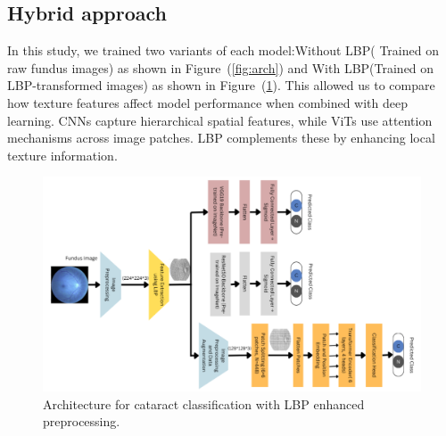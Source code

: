 \documentclass{ijclclp}
\begin{document}
\subsection{Hybrid approach}
\vspace{1em}
        In this study, we trained two variants of each model:Without LBP( Trained on raw fundus
images) as shown in Figure~(\ref{fig:arch}) and With LBP(Trained on LBP-transformed images) as shown in Figure~(\ref{fig:lbparch}). This allowed us to compare
how texture features affect model performance when combined with deep learning. CNNs
capture hierarchical spatial features, while ViTs use attention mechanisms across image
patches. LBP complements these by enhancing local texture information.
\vspace{1em}
\begin{figure}[ht]
    \centering
    \includegraphics[width=0.95\linewidth]{image.png}
    \caption{Architecture for cataract classification with LBP enhanced preprocessing.}
    \label{fig:lbparch}
\end{figure}
\end{document}
